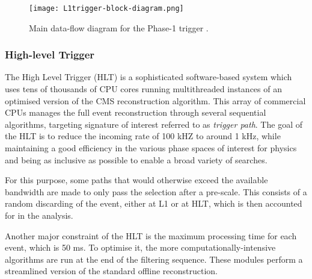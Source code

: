 \begin{figure}[thb]
  \centering
  \texttt{[image: L1trigger-block-diagram.png]}
  \caption{Main data-flow diagram for the Phase-1 \Lone trigger \cite{CMS-TDR-12}.}
  \label{fig:L1trigger-block-diagram}
\end{figure}

\subsubsection{High-level Trigger}
The High Level Trigger (HLT) is a sophisticated software-based system which uses tens of thousands of CPU cores
running multithreaded instances of an optimised version of the CMS reconstruction algorithm.
This array of commercial CPUs manages the full event reconstruction through several sequential algorithms,
targeting signature of interest referred to as \textit{trigger path}.
The goal of the HLT is to reduce the incoming \Lone rate of 100 kHZ to around 1 kHz,
while maintaining a good efficiency in the various phase spaces of interest for physics
and being as inclusive as possible to enable a broad variety of searches.

For this purpose, some paths that would otherwise exceed the available bandwidth are made to only pass the selection after a pre-scale.
This consists of a random discarding of the event, either at L1 or at HLT, which is then accounted for in the analysis.

Another major constraint of the HLT is the maximum processing time for each event, which is 50 ms.
To optimise it, the more computationally-intensive algorithms are run at the end of the filtering sequence.
These modules perform a streamlined version of the standard offline reconstruction.
